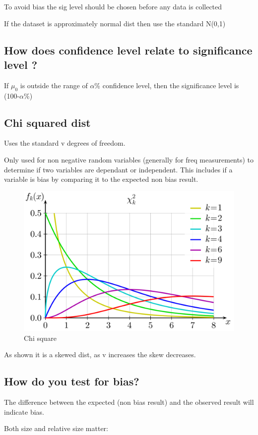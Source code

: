 \documentclass[11pt]{scrartcl} %
\begin{document}
To avoid bias the sig level should be chosen before any data is
collected

If the dataset is approximately normal dist then use the standard N(0,1)

\subsection{How does confidence level relate to significance level
?}

If \(\mu_0\) is outside the range of \(\alpha\)\% confidence level, then
the significance level is (100-\(\alpha\)\%)

\subsection{Chi squared dist}

Uses the standard v degrees of freedom.

Only used for non negative random variables (generally for freq
measurements) to determine if two variables are dependant or
independent. This includes if a variable is bias by comparing it to the
expected non bias result.

\begin{figure}[h] %
	\centering
	\includegraphics[width=0.5\columnwidth]{Chi-square_pdf.png} %
	\caption{Chi square}
\end{figure}

As shown it is a skewed dist, as v increases the skew decreases.

\subsection{How do you test for
bias?}

The difference between the expected (non bias result) and the observed
result will indicate bias.

Both size and relative size matter:
\end{document}
